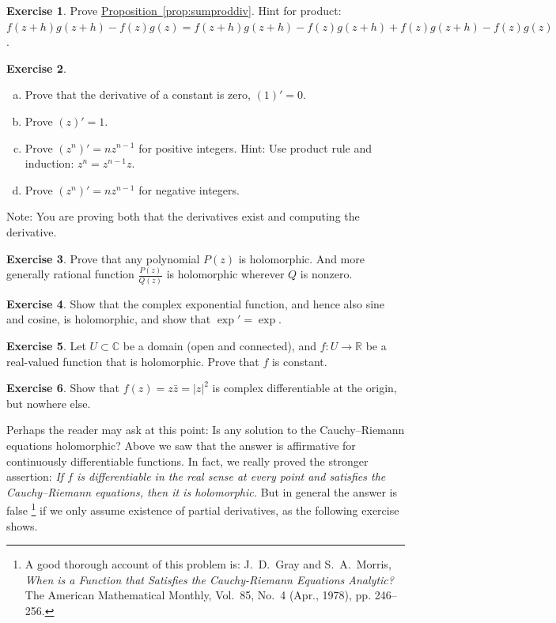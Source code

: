 \documentclass[12pt,openany]{book}
\newcommand{\sabs}[1]{\lvert {#1} \rvert}
\newcommand{\C}{{\mathbb{C}}}
\newcommand{\R}{{\mathbb{R}}}
\theoremstyle{plain}
\theoremstyle{remark}
\theoremstyle{definition}
\newenvironment{exbox}{%
    \def\FrameCommand{\vrule width 1pt \relax\hspace {10pt}}%
    \MakeFramed {\advance \hsize -\width \FrameRestore }%
}{%
    \endMakeFramed
}
\newenvironment{exparts}{%
    \leavevmode\begin{enumerate}[a),noitemsep,topsep=0pt,parsep=0pt,partopsep=0pt]
}{%
    \end{enumerate}
}
\theoremstyle{exercise}
\newtheorem{exercise}{Exercise}[section]
\theoremstyle{example}
\newcommand{\propref}[1]{\hyperref[#1]{Proposition~\ref*{#1}}}
\begin{document}
\begin{exbox}
\begin{exercise}
Prove \propref{prop:sumproddiv}.
Hint for product: 
$f(z+h)g(z+h) - f(z)g(z) =
f(z+h)g(z+h) - f(z)g(z+h) +
f(z)g(z+h) - f(z)g(z)$.
\end{exercise}

\begin{exercise}
\begin{samepage}
\begin{exparts}
\item
Prove that the derivative of a constant is zero, $(1)' = 0$.
\item
Prove $(z)' = 1$.
\item
Prove $(z^n)' = n z^{n-1}$ for positive integers.  Hint: Use product rule
and induction: $z^n = z^{n-1} z$.
\item
Prove $(z^n)' = n z^{n-1}$ for negative integers.
\end{exparts}
Note: You are proving both that the derivatives exist and
computing the derivative.
\end{samepage}
\end{exercise}

\begin{exercise}
Prove that any polynomial $P(z)$ is holomorphic.  And more generally
rational function $\frac{P(z)}{Q(z)}$ is holomorphic wherever $Q$ is
nonzero.
\end{exercise}

\begin{exercise} \label{exercise:exponentialholomorphic}
Show that the complex exponential function, and hence also sine and cosine,
is holomorphic, and show that $\exp' = \exp$.
\end{exercise}

\begin{exercise}
Let $U \subset \C$ be a domain (open and connected),
and $f \colon U \to \R$ be a real-valued function that is holomorphic.
Prove that $f$ is constant.
\end{exercise}

\begin{exercise}
Show that $f(z) = z \bar{z} = \sabs{z}^2$ is complex differentiable
at the origin, but nowhere else.
\end{exercise}
\end{exbox}

Perhaps the reader may ask at this point: Is any solution to
the Cauchy--Riemann equations holomorphic?  Above we saw that the answer
is affirmative for continuously differentiable functions.  In fact, we
really proved the stronger assertion: \emph{If $f$ is differentiable in the
real sense at every point and satisfies the Cauchy--Riemann equations, then
it is holomorphic.}
But in general the answer is false%
\footnote{%
A good thorough account of this problem is:
J.\ D.\ Gray and  S.\ A.\ Morris,
\emph{When is a Function that Satisfies the Cauchy-Riemann Equations
Analytic?}  The American Mathematical Monthly, Vol.\ 85, No.\ 4 (Apr.,
1978), pp. 246--256.} if we only assume existence of partial derivatives,
as the following exercise shows.
\end{document}
